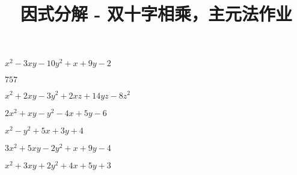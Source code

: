 \documentclass[windows,csize4]{BHCexam}
\title{因式分解 - 双十字相乘，主元法作业}
\begin{document}
\maketitle


\begin{groups}

    \begin{questions}[]
        \question[5] $x^2-3xy-10y^2+x+9y-2$
        \begin{solution}{0.5cm}
            \methodonly $757$
        \end{solution}
        \vspace{3.5cm}

        \question[5] $x^2+2xy-3y^2+2xz+14yz-8z^2$
        \begin{solution}{0.5cm}
            \methodonly 
        \end{solution}
        \vspace{3.5cm}

        \question[5] $2x^2+xy-y^2-4x+5y-6$
        \begin{solution}{0.5cm}
            \methodonly 
        \end{solution}
        \vspace{3.5cm}

        \question[5] $x^2-y^2+5x+3y+4$
        \begin{solution}{0.5cm}
            \methodonly 
        \end{solution}
        \vspace{3.5cm}

        \question[5] $3x^2+5xy-2y^2+x+9y-4$
        \begin{solution}{0.5cm}
            \methodonly 
        \end{solution}
        \vspace{3.5cm}

        \question[5] $x^2+3xy+2y^2+4x+5y+3$
        \begin{solution}{0.5cm}
            \methodonly 
        \end{solution}
        \vspace{3.5cm}




    \end{questions}

\end{groups}
\label{lastpage}
\end{document}
